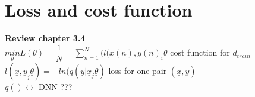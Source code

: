 \section{Loss and cost function}
\textbf{Review chapter 3.4}	\\
$ \underset{\underline{\theta}}{min}  L ( \underline{\theta  }) =  \dfrac{1}{N} = \sum_{n=1}^{N} (l(\underline{x}(n), y(n)_i \underline{\theta}$     cost function for $ d_{train } $ \\
$l(\underline{x}, \underline{y}_j \underline{\theta }) = - ln(q ( \underline{y} | \underline{x}_j \underline{\theta } )  $ loss for one pair $  (\underline{x}, \underline{y})  $ \\
$  q () \leftrightarrow $ DNN ???
